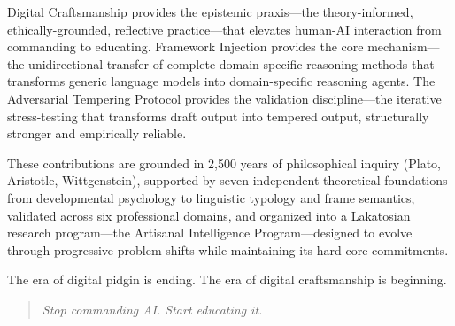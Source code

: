 \documentclass[12pt,a4paper]{article}
\begin{document}
Digital Craftsmanship provides the epistemic praxis---the theory-informed, ethically-grounded, reflective practice---that elevates human-AI interaction from commanding to educating. Framework Injection provides the core mechanism---the unidirectional transfer of complete domain-specific reasoning methods that transforms generic language models into domain-specific reasoning agents. The Adversarial Tempering Protocol provides the validation discipline---the iterative stress-testing that transforms draft output into tempered output, structurally stronger and empirically reliable.

These contributions are grounded in 2,500 years of philosophical inquiry (Plato, Aristotle, Wittgenstein), supported by seven independent theoretical foundations from developmental psychology to linguistic typology and frame semantics, validated across six professional domains, and organized into a Lakatosian research program---the Artisanal Intelligence Program---designed to evolve through progressive problem shifts while maintaining its hard core commitments.

The era of digital pidgin is ending. The era of digital craftsmanship is beginning.

\begin{quote}
\emph{Stop commanding AI. Start educating it.}
\end{quote}



\providecommand{\doi}[1]{\texttt{doi:\nolinkurl{#1}}}
\end{document}
